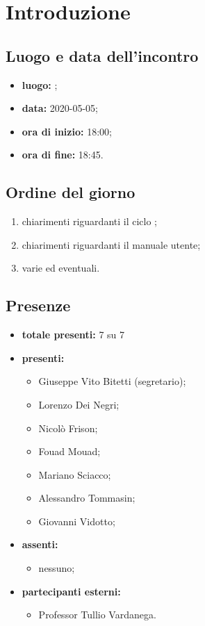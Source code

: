 \section*{Introduzione}

\subsection*{Luogo e data dell'incontro}
	\begin{itemize}
		\item \textbf{luogo:} ;
		\item \textbf{data:} 2020-05-05;
		\item \textbf{ora di inizio:} 18:00;
		\item \textbf{ora di fine:} 18:45.
	\end{itemize}

\subsection*{Ordine del giorno}
	\begin{enumerate}
		\item chiarimenti riguardanti il ciclo ;
		\item chiarimenti riguardanti il manuale utente;
		\item varie ed eventuali.
	\end{enumerate}

\subsection*{Presenze}
	\begin{itemize}
		\item \textbf{totale presenti:} 7 su 7
		\item \textbf{presenti: }
			\begin{itemize}
				\item Giuseppe Vito Bitetti (segretario);
				\item Lorenzo Dei Negri;
				\item Nicolò Frison;
				\item Fouad Mouad;
				\item Mariano Sciacco;
				\item Alessandro Tommasin;
				\item Giovanni Vidotto;
			\end{itemize}
		\item \textbf{assenti: }
			\begin{itemize}
				\item nessuno;
			\end{itemize}
		\item \textbf{partecipanti esterni:}
			\begin{itemize}
				\item Professor Tullio Vardanega.
			\end{itemize}
	\end{itemize}

